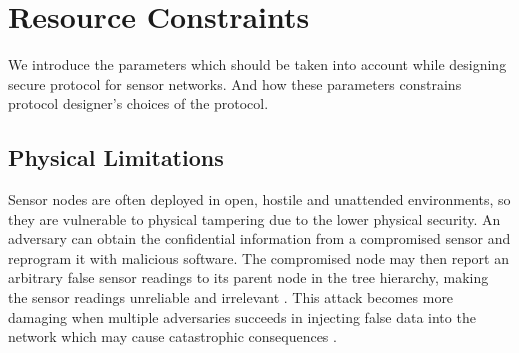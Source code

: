 \section{Resource Constraints}
	\label{sec:aggregate-adversary}
	We introduce the parameters which should be taken into account while designing secure protocol for sensor networks.  
	And how these parameters constrains protocol designer's choices of the protocol.

	\subsection{Physical Limitations}
		Sensor nodes are often deployed in open, hostile and unattended environments, so they are vulnerable to physical tampering due to the lower physical security.
		An adversary can obtain the confidential information from a compromised sensor and reprogram it with malicious software.
		The compromised node may then report an arbitrary false sensor readings to its parent node in the tree hierarchy, making the sensor readings unreliable and irrelevant	.
		This attack becomes more damaging when multiple adversaries succeeds in injecting false data into the network which may cause catastrophic consequences \cite{wagner2007algorithms}.	

